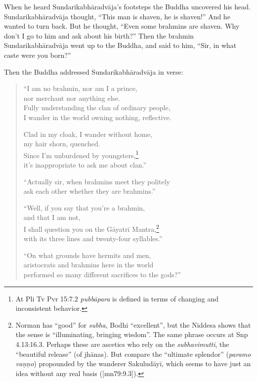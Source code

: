\documentclass[12pt,openany]{book}%
\begin{document}
When he heard \textsanskrit{Sundarikabhāradvāja}’s footsteps the Buddha uncovered his head. \textsanskrit{Sundarikabhāradvāja} thought, “This man is shaven, he is shaven!” And he wanted to turn back. But he thought, “Even some brahmins are shaven. Why don’t I go to him and ask about his birth?” Then the brahmin \textsanskrit{Sundarikabhāradvāja} went up to the Buddha, and said to him, “Sir, in what caste were you born?” 

Then the Buddha addressed \textsanskrit{Sundarikabhāradvāja} in verse: 

\begin{verse}%
“I am no brahmin, nor am I a prince, \\
nor merchant nor anything else. \\
Fully understanding the clan of ordinary people, \\
I wander in the world owning nothing, reflective. 

Clad in my cloak, I wander without home, \\
my hair shorn, quenched. \\
Since I’m unburdened by youngsters,\footnote{At Pli Tv Pvr 15:7.2 \textit{\textsanskrit{pubbāpara}} is defined in terms of changing and inconsistent behavior. } \\
it’s inappropriate to ask me about clan.” 

“Actually sir, when brahmins meet they politely \\
ask each other whether they are brahmins.” 

“Well, if you say that you’re a brahmin, \\
and that I am not, \\
I shall question you on the \textsanskrit{Gāyatrī} Mantra,\footnote{Norman has “good” for \textit{subha}, Bodhi “excellent”, but the Niddesa shows that the sense is “illuminating, bringing wisdom”. The same phrase occurs at Snp 4.13:16.3. Perhaps these are ascetics who rely on the \textit{subhavimutti}, the “beautiful release” (of \textsanskrit{jhānas}). But compare the “ultimate splendor” (\textit{paramo \textsanskrit{vaṇṇo}}) propounded by the wanderer \textsanskrit{Sakuludāyī}, which seems to have just an idea without any real basis ([mn79:9.3]). } \\
with its three lines and twenty-four syllables.” 

“On what grounds have hermits and men, \\
aristocrats and brahmins here in the world \\
performed so many different sacrifices to the gods?” 


\end{verse}
\end{document}
